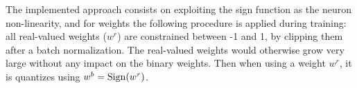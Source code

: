 


The implemented approach consists on exploiting the sign function as the neuron non-linearity, and for weights the following procedure is applied during training:
all real-valued weights ($w^r$) are constrained between -1 and 1, by clipping them after a batch normalization.
The real-valued weights would otherwise grow very large without any impact on the binary weights.
Then when using a weight $w^r$, it is quantizes using $w^b = {\rm Sign}(w^r)$.



